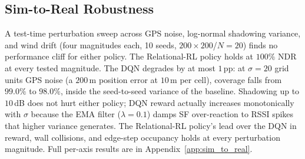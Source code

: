 \subsection{Sim-to-Real Robustness}
\label{sec:robustness}
\label{sec:clustered_curriculum}

A test-time perturbation sweep across GPS noise, log-normal shadowing variance, and wind drift (four magnitudes each, 10 seeds, $200{\times}200$/$N{=}20$) finds no performance cliff for either policy. The Relational-RL policy holds at $100\%$ NDR at every tested magnitude. The DQN degrades by at most $1$\,pp: at $\sigma{=}20$ grid units GPS noise (a $200$\,m position error at $10$\,m per cell), coverage falls from $99.0\%$ to $98.0\%$, inside the seed-to-seed variance of the baseline. Shadowing up to $10$\,dB does not hurt either policy; DQN reward actually increases monotonically with $\sigma$ because the EMA filter ($\lambda{=}0.1$) damps SF over-reaction to RSSI spikes that higher variance generates. The Relational-RL policy's lead over the DQN in reward, wall collisions, and edge-step occupancy holds at every perturbation magnitude. Full per-axis results are in Appendix~\ref{app:sim_to_real}.
